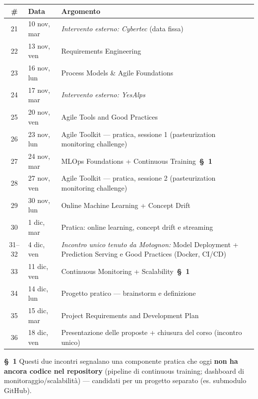 \documentclass[11pt,a4paper]{article}
\newcommand{\flag}[1]{{\small\color{coursegold}\bfseries \S\ #1}}
\begin{document}
\begin{center}
\begin{tabularx}{\textwidth}{@{}c l X@{}}
\toprule
\textbf{\#} & \textbf{Data} & \textbf{Argomento} \\
\midrule
21 & 10 nov, mar & \textit{Intervento esterno: Cybertec} (data fissa) \\
22 & 13 nov, ven & Requirements Engineering \\
23 & 16 nov, lun & Process Models \& Agile Foundations \\
24 & 17 nov, mar & \textit{Intervento esterno: YesAlps} \\
25 & 20 nov, ven & Agile Tools and Good Practices \\
26 & 23 nov, lun & Agile Toolkit --- pratica, sessione 1 (pasteurization monitoring challenge) \\
27 & 24 nov, mar & MLOps Foundations + Continuous Training~\flag{1} \\
28 & 27 nov, ven & Agile Toolkit --- pratica, sessione 2 (pasteurization monitoring challenge) \\
29 & 30 nov, lun & Online Machine Learning + Concept Drift \\
30 & 1 dic, mar & Pratica: online learning, concept drift e streaming \\
31--32 & 4 dic, ven & \textit{Incontro unico tenuto da Motognon:} Model Deployment + Prediction Serving e Good Practices (Docker, CI/CD) \\
33 & 11 dic, ven & Continuous Monitoring + Scalability~\flag{1} \\
34 & 14 dic, lun & Progetto pratico --- brainstorm e definizione \\
35 & 15 dic, mar & Project Requirements and Development Plan \\
36 & 18 dic, ven & Presentazione delle proposte + chiusura del corso (incontro unico) \\
\bottomrule
\end{tabularx}
\end{center}

\flag{1} Questi due incontri segnalano una componente pratica che oggi \textbf{non ha ancora codice nel repository} (pipeline di continuous training; dashboard di monitoraggio/scalabilità) --- candidati per un progetto separato (es. submodulo GitHub).
\end{document}
